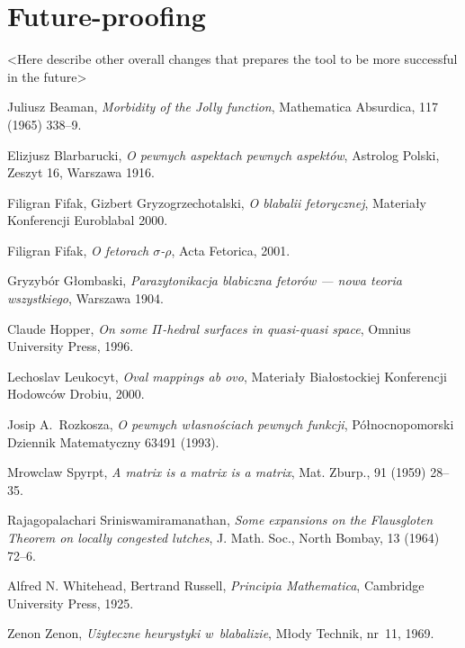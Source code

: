 \documentclass[licencjacka,en]{pracamgr}
\begin{document}
\section{Future-proofing}

<Here describe other overall changes that prepares the tool to be more successful in the future>



\appendix

\begin{thebibliography}{99}\label{r:bibliography}

 Juliusz Beaman, \textit{Morbidity of the Jolly
    function}, Mathematica Absurdica, 117 (1965) 338--9.

 Elizjusz Blarbarucki, \textit{O pewnych
    aspektach pewnych aspektów}, Astrolog Polski, Zeszyt 16, Warszawa
  1916.

 Filigran Fifak, Gizbert Gryzogrzechotalski,
  \textit{O blabalii fetorycznej}, Materiały Konferencji Euroblabal
  2000.

 Filigran Fifak, \textit{O fetorach
    $\sigma$-$\rho$}, Acta Fetorica, 2001.

 Gryzybór Głombaski, \textit{Parazytonikacja
    blabiczna fetorów --- nowa teoria wszystkiego}, Warszawa 1904.

 Claude Hopper, \textit{On some $\Pi$-hedral
    surfaces in quasi-quasi space}, Omnius University Press, 1996.

 Lechoslav Leukocyt, \textit{Oval mappings ab ovo},
  Materiały Białostockiej Konferencji Hodowców Drobiu, 2000.

 Josip A.~Rozkosza, \textit{O pewnych własnościach
    pewnych funkcji}, Północnopomorski Dziennik Matematyczny 63491
  (1993).

 Mrowclaw Spyrpt, \textit{A matrix is a matrix
    is a matrix}, Mat. Zburp., 91 (1959) 28--35.

 Rajagopalachari Sriniswamiramanathan,
  \textit{Some expansions on the Flausgloten Theorem on locally
    congested lutches}, J. Math.  Soc., North Bombay, 13 (1964) 72--6.

 Alfred N. Whitehead, Bertrand Russell,
  \textit{Principia Mathematica}, Cambridge University Press, 1925.

 Zenon Zenon, \textit{Użyteczne heurystyki
    w~blabalizie}, Młody Technik, nr~11, 1969.

\end{thebibliography}
\end{document}
